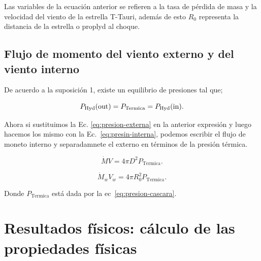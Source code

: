 Las variables de la ecuación anterior se refieren a la tasa de pérdida de masa y la velocidad del viento de la estrella T-Tauri, además de esto \(R_{0}\) representa la distancia de la estrella o proplyd al choque.

\subsection{Flujo de momento  del viento externo  y del viento interno }
\label{sec:momento}

De acuerdo a la suposición 1, existe un equilibrio de presiones tal que;
 
\begin{equation}
  \label{eq:igualda-presion}
  P_{\text{Hyd}}(\mathrm{out}{})=P_{\text{Termica}}=P_{\text{Hyd}}(\mathrm{in}{}).
\end{equation}

Ahora si sustituimos la Ec. \ref{eq:presion-externa} en la anterior expresión y luego hacemos los mismo con la Ec.~\ref{eq:presin-interna}, podemos escribir el flujo de moneto interno y separadamnete el externo en términos de la presión térmica. 

\begin{equation}
  \label{eq:momentum-out}
   \dot{M}V = 4 \pi  D^{2}  P_{\text{Termica}}. 
\end{equation}


\begin{equation}
  \label{eq:momentum}
   \dot{M}_{w}V_{w} = 4 \pi  R_{0}^{2}  P_{\text{Termica}}. 
\end{equation}

Donde \(P_{\text{Termica}}\) está dada por la ec~\ref{eq:presion-cascara}. 

\section{Resultados físicos: cálculo de las propiedades físicas }
\label{sec:results}

